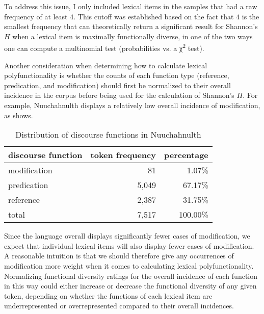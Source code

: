 To address this issue, I only included lexical items in the samples that had a raw frequency of at least $4$. This cutoff was established based on the fact that $4$ is the smallest frequency that can theoretically return a significant result for Shannon's $H$ when a lexical item is maximally functionally diverse, in one of the two ways one can compute a multinomial test (probabilities vs. a χ\textsuperscript{2} test).

Another consideration when determining how to calculate lexical polyfunctionality is whether the counts of each function type (reference, predication, and modification) should first be normalized to their overall incidence in the corpus before being used for the calculation of Shannon's $H$. For example, Nuuchahnulth displays a relatively low overall incidence of modification, as  shows.

\begin{table}[h]
  \centering
  \caption{Distribution of discourse functions in Nuuchahnulth}
  \label{tab:Nuuchahnulth-function-proportions}
  \begin{tabular}{ l r r }
    \toprule
    discourse function & token frequency & percentage\\
    \midrule
    modification &    81 &   1.07\%\\
    predication  & 5,049 &  67.17\%\\
    reference    & 2,387 &  31.75\%\\
    \midrule
    total        & 7,517 & 100.00\%\\
    \bottomrule
  \end{tabular}
\end{table}

\noindent Since the language overall displays significantly fewer cases of modification, we expect that individual lexical items will also display fewer cases of modification.  A reasonable intuition is that we should therefore give any occurrences of modification more weight when it comes to calculating lexical polyfunctionality. Normalizing functional diversity ratings for the overall incidence of each function in this way could either increase or decrease the functional diversity of any given token, depending on whether the functions of each lexical item are underrepresented or overrepresented compared to their overall incidences.


